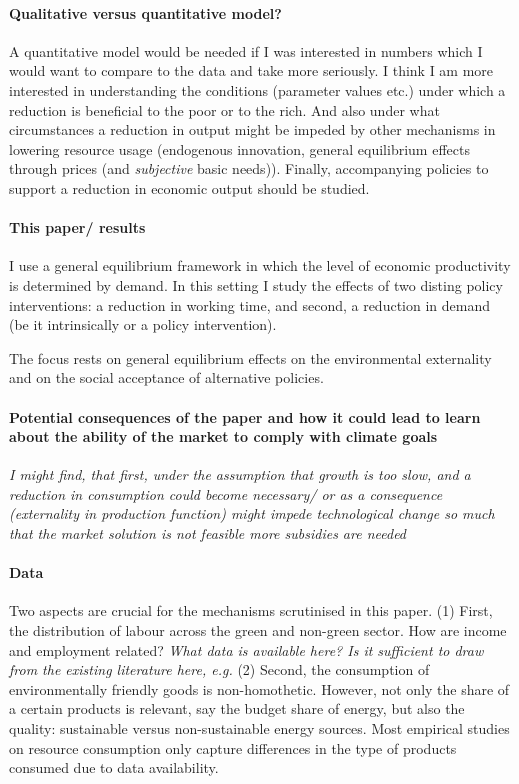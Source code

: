 \paragraph{Qualitative versus quantitative model?}
A quantitative model would be needed if I was interested in numbers which I would want to compare to the data and take more seriously. 
I think I am more interested in understanding the conditions (parameter values etc.) under which a reduction is beneficial to the poor or to the rich. And also under what circumstances a reduction in output might be impeded by other mechanisms in lowering resource usage (endogenous innovation, general equilibrium effects through prices (and \textit{subjective} basic needs)). Finally, accompanying policies to support a reduction in economic output should be studied. 


\paragraph{This paper/ results}
I use a general equilibrium framework in which the level of economic productivity is determined by demand. In this setting I study the effects of two disting policy interventions: a reduction in working time, and second, a reduction in demand (be it intrinsically or a policy intervention). 

The focus rests on general equilibrium effects on the environmental externality and on the social acceptance of alternative policies. 

\paragraph{Potential consequences of the paper and how it could lead to learn about the ability of the market to comply with climate goals}

\textit{I might find, that first, under the assumption that growth is too slow, and a reduction in consumption could become necessary/ or as a consequence (externality in production function) might impede technological change so much that the market solution is not feasible \ar more subsidies are needed}
\paragraph{Data}
Two aspects are crucial for the mechanisms scrutinised in this paper. (1) First, the distribution of labour across the green and non-green sector. How are income and employment related? \textit{What data is available here? Is it sufficient to draw from the existing literature here, e.g. }
(2) Second, the consumption of environmentally friendly goods is non-homothetic. However, not only the share of a certain products is relevant, say the budget share of energy, but also the quality: sustainable versus non-sustainable energy sources.
Most empirical studies on resource consumption only capture differences in the type of products consumed due to data availability. \citep{Sager2019IncomeCurves}

